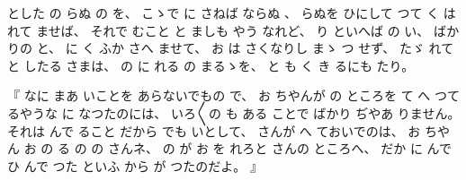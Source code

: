 とした
の
らぬ
の
を、
%
こゝで
に
さねば
ならぬ
、
%
らぬを
ひにして
つて
く
はれて
ませば、
%
それで
むこと%
%
と
ましも
やう
なれど、
%
り
といへば
の
い、
%
ばかりの
と、
%
に
く
ふか
さへ
ませて、
%
お
は
さくなりし
まゝ
つ
せず、
%
たゞ
れて
と
したる
さまは、
%
の
%
に
れる
の
まるゝを、
%
と
も
く
き
るにも
たり。

%
『
なに
まあ
いことを
あらないでもの
で、
%
お
ちやんが
の
ところを
て
へ
つて
るやうな
に
なつたのには、
%
いろ〳〵の
も
ある
ことで
ばかり
ぢやあ
りません。
%
%
それは
んで
ること
だから
でも
いとして、
%
さんが
へ
ておいでのは、
%
お
ちやん
お
の
る
の
の
%
さんネ、
%
の
が
お
を
れろと
さんの
ところへ、
%
だか
に
んで
ひ
んで
つた
といふ
から
が
つたのだよ。
』

